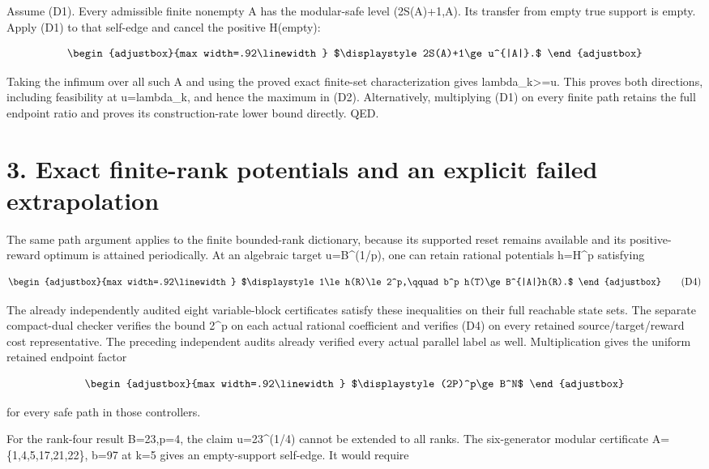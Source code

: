 Assume (D1). Every admissible finite nonempty A has the modular-safe level (2S(A)+1,A). Its transfer from empty true support is empty. Apply (D1) to that self-edge and cancel the positive H(empty):

\[
\begin{adjustbox}{max width=.92\linewidth}
$\displaystyle 2S(A)+1\ge u^{|A|}.$
\end{adjustbox}
\]

Taking the infimum over all such A and using the proved exact finite-set characterization gives lambda\_k\textgreater=u. This proves both directions, including feasibility at u=lambda\_k, and hence the maximum in (D2). Alternatively, multiplying (D1) on every finite path retains the full endpoint ratio and proves its construction-rate lower bound directly. QED.

\section{3. Exact finite-rank potentials and an explicit failed extrapolation}\label{n05-exact-finite-rank-potentials-and-an-explicit-failed-extrapolation}

The same path argument applies to the finite bounded-rank dictionary, because its supported reset remains available and its positive-reward optimum is attained periodically. At an algebraic target u=B\^{}(1/p), one can retain rational potentials h=H\^{}p satisfying

\[
\begin{adjustbox}{max width=.92\linewidth}
$\displaystyle 1\le h(R)\le2^p,\qquad
 b^p h(T)\ge B^{|A|}h(R).$
\end{adjustbox}
\tag{D4}
\]

The already independently audited eight variable-block certificates satisfy these inequalities on their full reachable state sets. The separate compact-dual checker verifies the bound 2\^{}p on each actual rational coefficient and verifies (D4) on every retained source/target/reward cost representative. The preceding independent audits already verified every actual parallel label as well. Multiplication gives the uniform retained endpoint factor

\[
\begin{adjustbox}{max width=.92\linewidth}
$\displaystyle (2P)^p\ge B^N$
\end{adjustbox}
\]

for every safe path in those controllers.

For the rank-four result B=23,p=4, the claim u=23\^{}(1/4) cannot be extended to all ranks. The six-generator modular certificate A=\{1,4,5,17,21,22\}, b=97 at k=5 gives an empty-support self-edge. It would require

